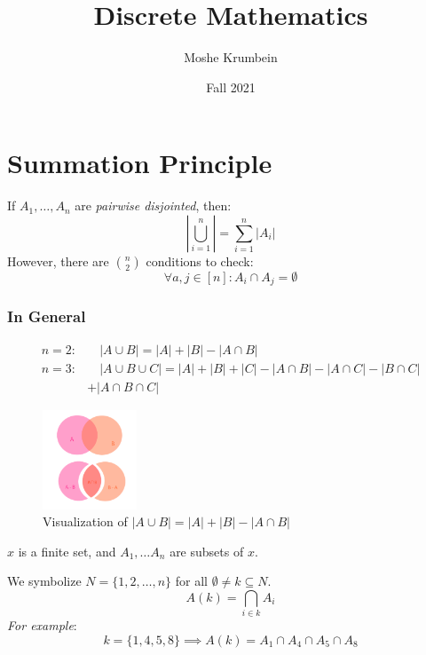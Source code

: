 \documentclass[00_complete]{subfiles}
\title{Discrete Mathematics}
\author{Moshe Krumbein}
\date{Fall 2021}
\begin{document}

\section{Summation Principle}

\begin{theorem}
    If $A_1,\dots,A_n$ are \emph{pairwise disjointed}, then:
    $$\left|\bigcup_{i=1}^n\right| = \sum_{i=1}^{n}|A_i|$$
    However, there are $\binom{n}{2}$ conditions to check:
    $$\forall a,j \in [n]: A_i \cap A_j = \emptyset$$
\end{theorem}

\subsubsection{In General}

$$
\begin{aligned}
    n=2:& \quad|A \cup B| = |A| + |B| - |A \cap B| \\
    n=3:& \quad|A \cup B \cup C| = |A| + |B| + |C| - |A \cap B| - |A \cap C| - |B \cap
C| \\&+ |A \cap B \cap C|
\end{aligned}$$

\begin{figure}[ht]
  \centering
    \includegraphics[width=0.25\textwidth]{w7_venn1}
    \caption{Visualization of $|A \cup B| = |A| + |B| - |A \cap B|$}
\end{figure}

\begin{symbols}
    $x$ is a finite set, and $A_1,\dots A_n$ are subsets of $x$.

    We symbolize $N=\{1,2,\dots,n\}$ for all $\emptyset \neq k \subseteq N$.
    $$A(k) = \bigcap_{i \in k}A_i$$
    \emph{For example}:
    $$k = \{1,4,5,8\} \implies A(k) = A_1 \cap A_4 \cap A_5 \cap A_8$$
\end{symbols}
\end{document}
